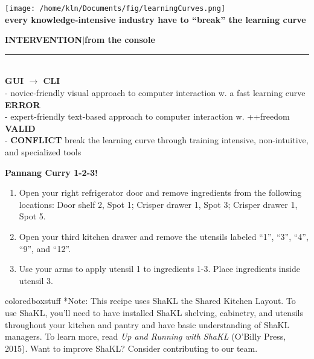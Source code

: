 \documentclass[8pt]{beamer}
\begin{document}
\begin{frame}
	\begin{center}
		\texttt{[image: /home/kln/Documents/fig/learningCurves.png]}\\
		\bigskip
	\textbf{every knowledge-intensive industry have to ``break'' the learning curve}
	\end{center}
\end{frame}

\begin{frame}
	\textbf{INTERVENTION$\mid$from the console}\\
	\noindent\rule{1cm}{0.6pt}\\
	{\small \textbf{GUI $\rightarrow$ CLI}}\\
	- novice-friendly visual approach to computer interaction w. a fast learning curve \colorbox{red!30}{\tiny \textbf{ERROR}}\\
	- expert-friendly text-based approach to computer interaction w. ++freedom \colorbox{green!30}{\tiny \textbf{VALID}}\\
	- \colorbox{yellow!30}{\tiny \textbf{CONFLICT}} break the learning curve through training intensive, non-intuitive, and specialized tools\\   
\end{frame}

\begin{frame}%
	\textbf{Pannang Curry 1-2-3!}\\
	\medskip
	\begin{enumerate}
		\item Open your right refrigerator door and remove ingredients from the following locations: Door shelf 2, Spot 1; Crisper drawer 1, Spot 3; Crisper drawer 1, Spot 5.
		\item Open your third kitchen drawer and remove the utensils labeled ``1'', ``3'', ``4'', ``9'', and ``12''.
		\item Use your arms to apply utensil 1 to ingredients 1-3. Place ingredients inside utensil 3.
	\end{enumerate}
	\medskip
  	\begin{beamercolorbox}[wd=1\textwidth,sep=1em]{coloredboxstuff}
    		*Note: This recipe uses ShaKL the Shared Kitchen Layout. To use ShaKL, you'll need to have installed ShaKL shelving, cabinetry, and utensils throughout your kitchen and pantry and have basic understanding of ShaKL managers. To learn more, read \textit{Up and Running with ShaKL} (O'Billy Press, 2015). Want to improve ShaKL? Consider contributing to our team.
    	\end{beamercolorbox}
\end{frame}
\end{document}

